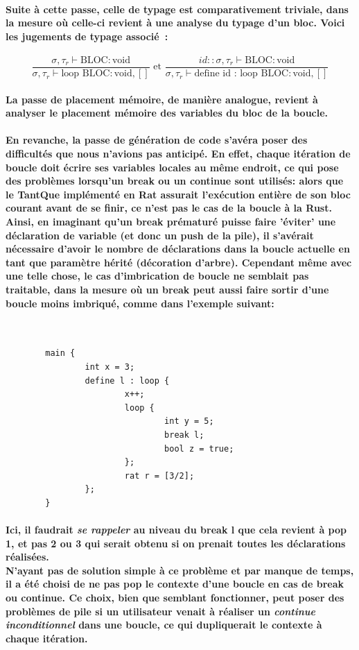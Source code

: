 \documentclass[french]{article}
\newcommand{\jugementLoop}{
        \dfrac{\sigma, \tau_r \vdash \text{BLOC} : \text{void}}
              {\sigma, \tau_r \vdash \text{loop} \text{ BLOC} : \text{void}, []}
        }
\newcommand{\jugementLoopId}{
        \dfrac{id::\sigma, \tau_r \vdash \text{BLOC} : \text{void}}
              {\sigma, \tau_r \vdash \text{define id : loop} \text{ BLOC} : \text{void}, []}
        }
\begin{document}
\paragraph{Suite à cette passe, celle de typage est comparativement triviale, dans la mesure où celle-ci revient à une analyse
du typage d'un bloc. Voici les jugements de typage associé~:}
 \[\jugementLoop \text{ et } \jugementLoopId\]
\paragraph{La passe de placement mémoire, de manière analogue, revient à analyser le placement mémoire des variables du bloc de la boucle.}
\paragraph{En revanche, la passe de génération de code s'avéra poser des difficultés que nous n'avions pas anticipé. En effet, chaque itération de boucle doit
écrire ses variables locales au même endroit, ce qui pose des problèmes lorsqu'un break ou un continue sont utilisés: alors que le TantQue
implémenté en Rat assurait l'exécution entière de son bloc courant avant de se finir, ce n'est pas le cas de la boucle à la Rust. \\
Ainsi, en imaginant qu'un break prématuré puisse faire 'éviter' une déclaration de variable (et donc un push de la pile), il s'avérait nécessaire
d'avoir le nombre de déclarations dans la boucle actuelle en tant que paramètre hérité (décoration d'arbre). Cependant même avec une telle chose, 
le cas d'imbrication de boucle ne semblait pas traitable, dans la mesure où un break peut aussi faire sortir d'une boucle moins imbriqué, comme dans 
l'exemple suivant:}

\, %
\begin{lstlisting}
        main {
                int x = 3;
                define l : loop {
                        x++;
                        loop {
                                int y = 5;
                                break l;
                                bool z = true;
                        };
                        rat r = [3/2];
                };
        }
\end{lstlisting}
\paragraph{Ici, il faudrait \textit{se rappeler} au niveau du break l que cela revient à pop 1, et pas 2 ou 3 qui serait obtenu si on prenait toutes les déclarations réalisées.\\
N'ayant pas de solution simple à ce problème et par manque de temps, il a été choisi de ne \textbf{pas} pop le contexte d'une boucle en cas de break ou continue.
Ce choix, bien que semblant fonctionner, peut poser des problèmes de pile si un utilisateur venait à réaliser un \textit{continue inconditionnel} dans une boucle, 
ce qui dupliquerait le contexte à chaque itération.}
\end{document}
